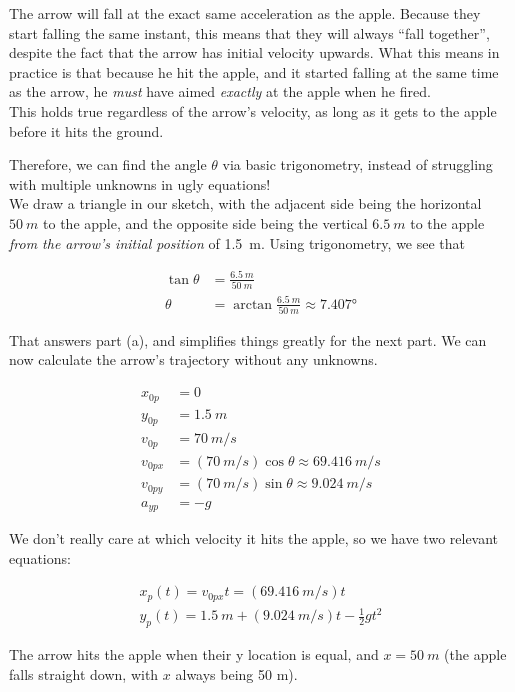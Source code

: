 \documentclass[12pt,a4paper]{report}
\begin{document}
The arrow will fall at the exact same acceleration as the apple. Because they start falling the same instant, this means that they will always ``fall together'', despite the fact that the arrow has initial velocity upwards. What this means in practice is that because he hit the apple, and it started falling at the same time as the arrow, he \emph{must} have aimed \emph{exactly} at the apple when he fired.\\
This holds true regardless of the arrow's velocity, as long as it gets to the apple before it hits the ground.

Therefore, we can find the angle $\theta$ via basic trigonometry, instead of struggling with multiple unknowns in ugly equations!\\
We draw a triangle in our sketch, with the adjacent side being the horizontal $\SI{50}{m}$ to the apple, and the opposite side being the vertical $\SI{6.5}{m}$ to the apple \emph{from the arrow's initial position} of \SI{1.5}{m}. Using trigonometry, we see that

\begin{align}
\tan \theta &= \frac{\SI{6.5}{m}}{\SI{50}{m}}\\
\theta &= \arctan \frac{\SI{6.5}{m}}{\SI{50}{m}} \approx \ang{7.407}
\end{align}

That answers part (a), and simplifies things greatly for the next part. We can now calculate the arrow's trajectory without any unknowns.

\begin{align}
x_{0p} &= 0\\
y_{0p} &= \SI{1.5}{m}\\
v_{0p} &= \SI{70}{m/s}\\
v_{0px} &= (\SI{70}{m/s}) \cos \theta \approx \SI{69.416}{m/s}\\
v_{0py} &= (\SI{70}{m/s}) \sin \theta \approx \SI{9.024}{m/s}\\
a_{yp} &= -g
\end{align}

We don't really care at which velocity it hits the apple, so we have two relevant equations:

\begin{align}
x_p(t) = v_{0px} t = (\SI{69.416}{m/s}) t\\
y_p(t) = \SI{1.5}{m} + (\SI{9.024}{m/s}) t - \frac{1}{2} g t^2
\end{align}

The arrow hits the apple when their y location is equal, and $x = \SI{50}{m}$ (the apple falls straight down, with $x$ always being 50 m).
\end{document}
